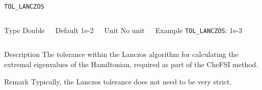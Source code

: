 \documentclass[xcolor=dvipsnames,t]{beamer}
\begin{document}
\begin{frame}[allowframebreaks]{\texttt{TOL\_LANCZOS}} \label{TOL_LANCZOS}
\vspace*{-12pt}
\begin{columns}
\begin{block}{Type}
Double
\end{block}

\begin{block}{Default}
1e-2
\end{block}

\begin{block}{Unit}
No unit
\end{block}

\begin{block}{Example}
\texttt{TOL\_LANCZOS}: 1e-3
\end{block}
\end{columns}

\begin{block}{Description}
The tolerance within the Lanczos algorithm for calculating the extremal eigenvalues of the Hamiltonian, required as part of the CheFSI method. 
\end{block}

\begin{block}{Remark}
Typically, the Lanczos tolerance does not need to be very strict.
\end{block}

\end{frame}
\end{document}
